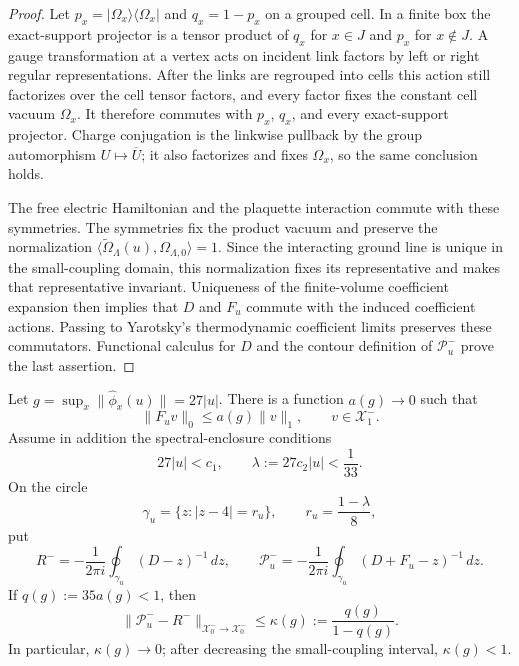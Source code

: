 \begin{proof}
Let $p_x=|\Omega_x\rangle\langle\Omega_x|$ and $q_x=1-p_x$ on a grouped
cell.  In a finite box the exact-support projector is a tensor product of
$q_x$ for $x\in J$ and $p_x$ for $x\notin J$.  A gauge transformation at a
vertex acts on incident link factors by left or right regular
representations.  After the links are regrouped into cells this action still
factorizes over the cell tensor factors, and every factor fixes the constant
cell vacuum $\Omega_x$.  It therefore commutes with $p_x$, $q_x$, and every
exact-support projector.  Charge conjugation is the linkwise pullback by the
group automorphism $U\mapsto\overline U$; it also factorizes and fixes
$\Omega_x$, so the same conclusion holds.

 The free electric Hamiltonian and the plaquette interaction commute with
 these symmetries.  The symmetries fix the product vacuum and preserve the
 normalization
 $\langle\widetilde\Omega_\Lambda(u),\Omega_{\Lambda,0}\rangle=1$.
 Since the interacting ground line is unique in the small-coupling domain,
 this normalization fixes its representative and makes that representative
 invariant.  Uniqueness of the finite-volume coefficient expansion then
 implies that $D$ and $F_u$
commute with the induced coefficient actions.  Passing to Yarotsky's
thermodynamic coefficient limits preserves these commutators.  Functional
calculus for $D$ and the contour definition of $\mathcal P_u^-$ prove the
last assertion.
\end{proof}

\begin{lemma}
\label{lem:g18-cmp1-close-projection-complete}
Let $g=\sup_x\|\widehat\phi_x(u)\|=27|u|$.  There is a function
$a(g)\to0$ such that
\begin{equation}
 \|F_uv\|_0\le a(g)\|v\|_1,
 \qquad v\in\mathcal X_1^-.
 \label{eq:g18-cmp1-relative-bound}
\end{equation}
 Assume in addition the spectral-enclosure conditions
 \begin{equation}
  27|u|<c_1,\qquad
  \lambda:=27c_2|u|<\frac1{33}.
  \label{eq:g18-cmp1-enclosure-smallness}
 \end{equation}
 On the circle
 \begin{equation}
  \gamma_u=\{z:|z-4|=r_u\},
  \qquad r_u=\frac{1-\lambda}{8},
  \label{eq:g18-cmp1-dynamic-contour}
 \end{equation}
 put
 \begin{equation}
  R^-=-\frac1{2\pi i}\oint_{\gamma_u}(D-z)^{-1}\,dz,
  \qquad
  \mathcal P_u^-=-\frac1{2\pi i}
        \oint_{\gamma_u}(D+F_u-z)^{-1}\,dz .
  \label{eq:g18-cmp1-projections}
 \end{equation}
 If $q(g):=35a(g)<1$, then
\begin{equation}
 \boxed{\quad
 \|\mathcal P_u^--R^-\|_{\mathcal X_0^-\to\mathcal X_0^-}
 \le \kappa(g):=\frac{q(g)}{1-q(g)}.
 \quad}
 \label{eq:g18-cmp1-kappa}
\end{equation}
In particular, $\kappa(g)\to0$; after decreasing the small-coupling
interval, $\kappa(g)<1$.
\end{lemma}


